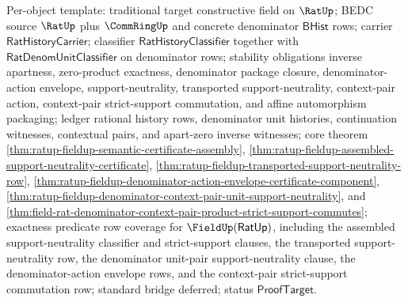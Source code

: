 Per-object template: traditional target constructive field on $\RatUp$; BEDC
source $\RatUp$ plus $\CommRingUp$ and concrete denominator $\mathsf{BHist}$
rows; carrier $\mathsf{RatHistoryCarrier}$; classifier
$\mathsf{RatHistoryClassifier}$ together with
$\mathsf{RatDenomUnitClassifier}$ on denominator rows; stability obligations
inverse apartness, zero-product exactness, denominator package closure,
denominator-action envelope, support-neutrality, transported support-neutrality,
context-pair action, context-pair strict-support commutation, and affine
automorphism packaging;
ledger rational history rows, denominator unit histories, continuation
witnesses, contextual pairs, and apart-zero inverse witnesses; core theorem
\autoref{thm:ratup-fieldup-semantic-certificate-assembly},
\autoref{thm:ratup-fieldup-assembled-support-neutrality-certificate},
\autoref{thm:ratup-fieldup-transported-support-neutrality-row},
\autoref{thm:ratup-fieldup-denominator-action-envelope-certificate-component},
\autoref{thm:ratup-fieldup-denominator-context-pair-unit-support-neutrality},
and
\autoref{thm:field-rat-denominator-context-pair-product-strict-support-commutes};
exactness predicate row coverage for $\FieldUp(\mathsf{RatUp})$, including the
assembled support-neutrality classifier and strict-support clauses, the
transported support-neutrality row, the denominator unit-pair
support-neutrality clause, the denominator-action envelope rows, and the
context-pair strict-support commutation row; standard bridge deferred; status
$\mathsf{ProofTarget}$.
